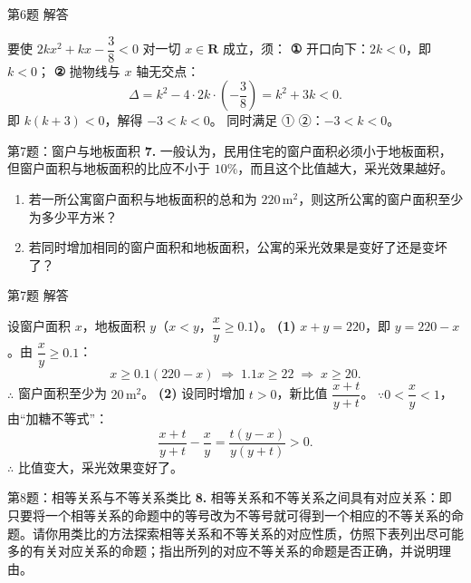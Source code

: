 \documentclass[10pt,aspectratio=169,serif]{beamer}
\begin{document}
\begin{frame}[t]{第6题 解答}
\begin{tcolorbox}[colback=orange!10,colframe=orange,title=\textbf{解}]
要使 $2kx^{2}+kx-\dfrac{3}{8}<0$ 对一切 $x\in\mathbf{R}$ 成立，须：
\vspace{0.3em}
\textbf{①} 开口向下：$2k<0$，即 $k<0$；
\vspace{0.3em}
\textbf{②} 抛物线与 $x$ 轴无交点：
\[
\Delta=k^{2}-4\cdot 2k\cdot\left(-\frac{3}{8}\right)=k^{2}+3k<0.
\]
即 $k(k+3)<0$，解得 $-3<k<0$。
\vspace{0.5em}
同时满足 ① ②：\alert{$-3<k<0$}。
\end{tcolorbox}
\end{frame}

\begin{frame}[t]{第7题：窗户与地板面积}
\textbf{7.} 一般认为，民用住宅的窗户面积必须小于地板面积，但窗户面积与地板面积的比应不小于 $10\%$，而且这个比值越大，采光效果越好。
\begin{enumerate}
  \item 若一所公寓窗户面积与地板面积的总和为 $220\,\text{m}^{2}$，则这所公寓的窗户面积至少为多少平方米？
  \item 若同时增加相同的窗户面积和地板面积，公寓的采光效果是变好了还是变坏了？
\end{enumerate}
\end{frame}

\begin{frame}[t]{第7题 解答}
\begin{tcolorbox}[colback=orange!10,colframe=orange,title=\textbf{解}]
设窗户面积 $x$，地板面积 $y$（$x<y$，$\dfrac{x}{y}\ge 0.1$）。
\vspace{0.3em}
\textbf{(1)} $x+y=220$，即 $y=220-x$。由 $\dfrac{x}{y}\ge 0.1$：
\[
x\ge 0.1(220-x)\;\Longrightarrow\;1.1x\ge 22\;\Longrightarrow\;x\ge 20.
\]
$\therefore$ 窗户面积至少为 \alert{$20\,\text{m}^{2}$}。
\vspace{0.5em}
\textbf{(2)} 设同时增加 $t>0$，新比值 $\dfrac{x+t}{y+t}$。
$\because 0<\dfrac{x}{y}<1$，由“加糖不等式”：
\[
\frac{x+t}{y+t}-\frac{x}{y}=\frac{t(y-x)}{y(y+t)}>0.
\]
$\therefore$ 比值变大，\alert{采光效果变好了}。
\end{tcolorbox}
\end{frame}

\begin{frame}[t]{第8题：相等关系与不等关系类比}
\textbf{8.} 相等关系和不等关系之间具有对应关系：即只要将一个相等关系的命题中的等号改为不等号就可得到一个相应的不等关系的命题。请你用类比的方法探索相等关系和不等关系的对应性质，仿照下表列出尽可能多的有关对应关系的命题；指出所列的对应不等关系的命题是否正确，并说明理由。
\end{frame}
\end{document}
